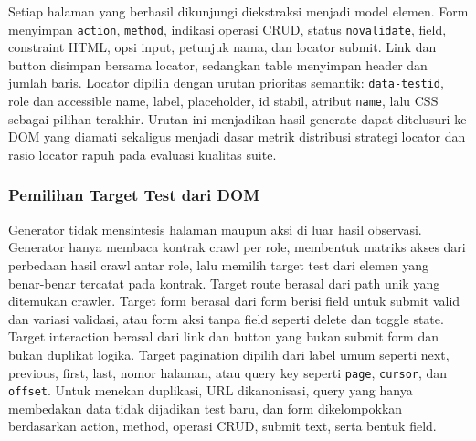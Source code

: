 \documentclass[conference]{IEEEtran}
\begin{document}
Setiap halaman yang berhasil dikunjungi diekstraksi menjadi model elemen. Form menyimpan \texttt{action}, \texttt{method}, indikasi operasi CRUD, status \texttt{novalidate}, field, constraint HTML, opsi input, petunjuk nama, dan locator submit. Link dan button disimpan bersama locator, sedangkan table menyimpan header dan jumlah baris. Locator dipilih dengan urutan prioritas semantik: \texttt{data-testid}, role dan accessible name, label, placeholder, id stabil, atribut \texttt{name}, lalu CSS sebagai pilihan terakhir. Urutan ini menjadikan hasil generate dapat ditelusuri ke DOM yang diamati sekaligus menjadi dasar metrik distribusi strategi locator dan rasio locator rapuh pada evaluasi kualitas suite.

\subsubsection{Pemilihan Target Test dari DOM}

Generator tidak mensintesis halaman maupun aksi di luar hasil observasi. Generator hanya membaca kontrak crawl per role, membentuk matriks akses dari perbedaan hasil crawl antar role, lalu memilih target test dari elemen yang benar-benar tercatat pada kontrak. Target route berasal dari path unik yang ditemukan crawler. Target form berasal dari form berisi field untuk submit valid dan variasi validasi, atau form aksi tanpa field seperti delete dan toggle state. Target interaction berasal dari link dan button yang bukan submit form dan bukan duplikat logika. Target pagination dipilih dari label umum seperti next, previous, first, last, nomor halaman, atau query key seperti \texttt{page}, \texttt{cursor}, dan \texttt{offset}. Untuk menekan duplikasi, URL dikanonisasi, query yang hanya membedakan data tidak dijadikan test baru, dan form dikelompokkan berdasarkan action, method, operasi CRUD, submit text, serta bentuk field.
\end{document}
